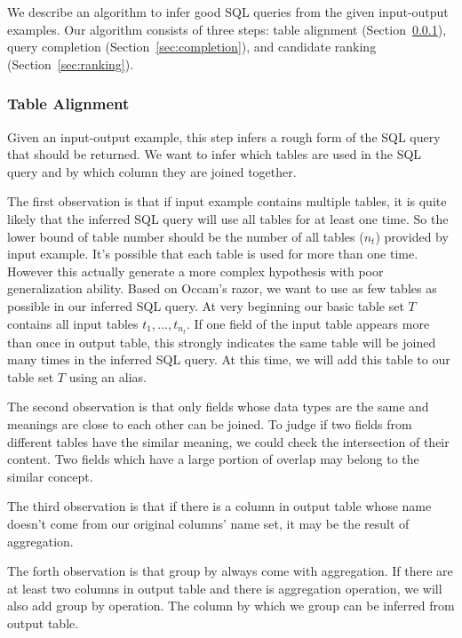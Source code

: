 We describe an algorithm to infer good SQL queries from the given
input-output examples. Our algorithm consists of three steps:
table alignment (Section~\ref{sec:alignment}),
query completion (Section~\ref{sec:completion}), and
candidate ranking (Section~\ref{sec:ranking}).


\subsubsection{Table Alignment}
\label{sec:alignment}

Given an input-output example, this step infers a rough form of the SQL query that should be returned. We want to infer which tables are used in the SQL query and by which column they are joined together.

The first observation is that if input example contains multiple tables, it is quite likely that the inferred SQL query will use all tables for at least one time. So the lower bound of table number should be the number of all tables ($n_t$) provided by input example. It's possible that each table is used for more than one time. However this actually generate a more complex hypothesis with poor generalization ability. Based on Occam's razor, we want to use as few tables as possible in our inferred SQL query. At very beginning our basic table set  $T$ contains all input tables $t_1,..., t_{n_t}$. If one field of the input table appears more than once in output table, this strongly indicates the same table will be joined many times in the inferred SQL query. At this time, we will add this table to our table set $T$ using an alias.

The second observation is that only fields whose data types are the same and meanings are close to each other can be joined. To judge if two fields from different tables have the similar meaning, we could check the intersection of their content. Two fields which have a large portion of overlap may belong to the similar concept.

The third observation is that if there is a column in output table whose name doesn't come from our original columns' name set, it may be the result of aggregation.

The forth observation is that group by always come with aggregation. If there are at least two columns in output table and there is aggregation operation, we will also add group by operation. The column by which we group can be inferred from output table.

